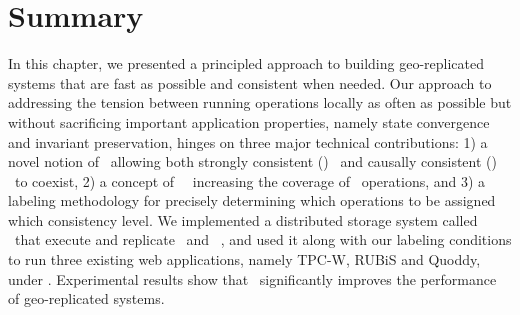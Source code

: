 \section{Summary}%
\label{ch:redblue:sect:conclusion}
In this chapter, we presented a principled approach to building
geo-replicated systems that are fast as possible and consistent when needed.
Our approach to addressing the
tension between running operations locally as often as possible
but without sacrificing important application properties, namely state
convergence and invariant preservation, hinges on
three major technical contributions:
1) a novel notion of \RBc\ allowing
both stron\-gly consistent (\red) \operations\ and causally consistent (\blue)
\operations\ to coexist, 2) a concept of \shadow\ \operation\ increasing the
coverage of \blue\ operations, and 3) a labeling methodology for
precisely determining which operations to be assigned which consistency level.
We implemented a distributed storage system called \gemini\ that 
execute and replicate \red\ and \blue\ \operations , and used it along with our labeling
conditions to run three existing web applications, namely TPC-W, RUBiS and Quoddy, under \RBCN.
Experimental results show that \RBc\ significantly improves the performance of geo-replicated
systems.

